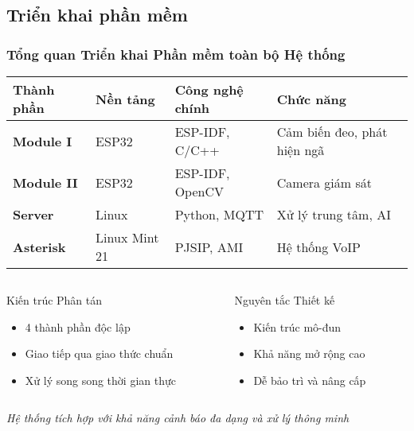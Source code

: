 \subsection{Triển khai phần mềm}
\begin{frame}
\frametitle{Tổng quan Triển khai Phần mềm toàn bộ Hệ thống}

\begin{table}[htbp]
\centering
\small
\begin{tabular}{|l|l|l|l|}
\hline
\textbf{Thành phần} & \textbf{Nền tảng} & \textbf{Công nghệ chính} & \textbf{Chức năng} \\
\hline
\textbf{Module I} & ESP32 & ESP-IDF, C/C++ & Cảm biến đeo, phát hiện ngã \\
\hline
\textbf{Module II} & ESP32 & ESP-IDF, OpenCV & Camera giám sát \\
\hline
\textbf{Server} & Linux & Python, MQTT & Xử lý trung tâm, AI \\
\hline
\textbf{Asterisk} & Linux Mint 21 & PJSIP, AMI & Hệ thống VoIP \\
\hline
\end{tabular}
\end{table}

\vspace{0.3cm}

\begin{columns}[t]
\begin{column}{0.48\textwidth}
\begin{block}{Kiến trúc Phân tán}
\begin{itemize}
\item 4 thành phần độc lập
\item Giao tiếp qua giao thức chuẩn
\item Xử lý song song thời gian thực
\end{itemize}
\end{block}
\end{column}

\begin{column}{0.48\textwidth}
\begin{alertblock}{Nguyên tắc Thiết kế}
\begin{itemize}
\item Kiến trúc mô-đun
\item Khả năng mở rộng cao
\item Dễ bảo trì và nâng cấp
\end{itemize}
\end{alertblock}
\end{column}
\end{columns}

\vspace{0.3cm}
\begin{center}
\textit{\small Hệ thống tích hợp với khả năng cảnh báo đa dạng và xử lý thông minh}
\end{center}

\end{frame}
